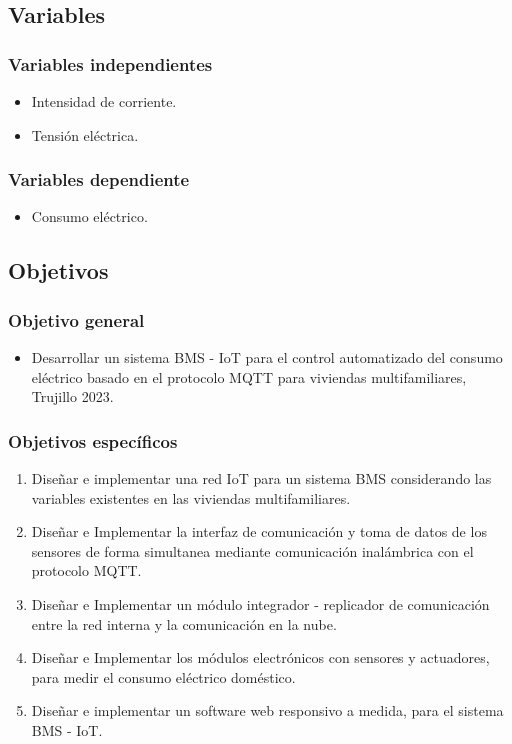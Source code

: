 \documentclass[a4paper, 12pt]{article}
\begin{document}
\subsection{Variables}

\vskip 0.2cm  
\subsubsection{Variables independientes}

\begin{itemize}
\item Intensidad de corriente.
\item Tensión eléctrica.
\end{itemize}

\subsubsection{Variables dependiente}
\begin{itemize}
\item Consumo eléctrico.
\end{itemize}

\subsection{Objetivos}

\vskip 0.2cm 
\subsubsection{Objetivo general}
\begin{itemize}
\item Desarrollar un sistema BMS - IoT para el control automatizado del consumo eléctrico basado en el protocolo MQTT para viviendas multifamiliares, Trujillo 2023.
\end{itemize}

\subsubsection{Objetivos específicos}
\begin{enumerate}
\item Diseñar e implementar una red IoT para un sistema BMS considerando las variables existentes en las viviendas multifamiliares.
\item Diseñar e Implementar la interfaz de comunicación y toma de datos de los sensores de forma simultanea mediante comunicación inalámbrica con el protocolo MQTT.
\item Diseñar e Implementar un módulo integrador - replicador de comunicación entre la red interna y la comunicación en la nube.
\item Diseñar e Implementar los módulos electrónicos con sensores y actuadores, para medir el consumo eléctrico doméstico.
\item Diseñar e implementar un software web responsivo a medida, para el sistema BMS - IoT.
\end{enumerate}
\end{document}
